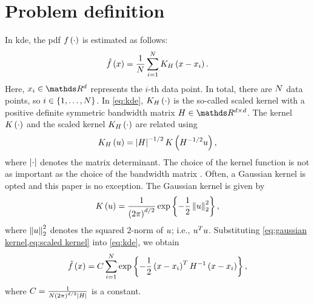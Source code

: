 \section{Problem definition}
\label{sec:problem}

In \ac{kde}, the \ac{pdf} $f\left( \cdot \right)$ is estimated as follows:
\begin{equation}
	\label{eq:kde}
	\hat{f}\left( x \right) = 
	\frac{1}{N} \sum_{i=1}^{N} 
	K_{H} \left( x - x_{i} \right).
\end{equation}
Here, $\datapoint{\indexdata} \in \realnumbers^{\dimension}$ represents the $i$-th data point.
In total, there are $N$ data points, so $i \in \{1, \ldots, N\}$.
In \cref{eq:kde}, $K_{H} \left( \cdot \right)$ is the so-called scaled kernel with a positive definite symmetric bandwidth matrix $\bandwidthmatrix \in \realnumbers^{\dimension \times \dimension}$.
The kernel $K \left( \cdot \right)$ and the scaled kernel $K_{H} \left( \cdot \right)$ are related using
\begin{equation}
	\label{eq:scaled kernel}
	K_{H} \left( u \right)
	= \left| H \right|^{-1/2} K \left(  H^{-1/2} u  \right),
\end{equation}
where $\left| \cdot \right|$ denotes the matrix determinant.
The choice of the kernel function is not as important as the choice of the bandwidth matrix \autocite{turlach1993bandwidthselection}.
Often, a Gaussian kernel is opted and this paper is no exception.
The Gaussian kernel is given by
\begin{equation}
	\label{eq:gaussian kernel}
	K \left( u \right) = \frac{1}{\left(2 \pi \right)^{d/2}} \exp\left\{  -\frac{1}{2} \left\Vert u \right\Vert_2^2 \right\},
\end{equation}
where $\left\Vert u \right\Vert_2^2$ denotes the squared 2-norm of $u$; i.e., $u^T u$.
Substituting \cref{eq:gaussian kernel,eq:scaled kernel} into \cref{eq:kde}, we obtain
\begin{equation}
	\label{eq:gaussian kde}
	\hat{f}\left( x \right)
	= C
	\sum_{i=1}^{N} 
	\exp\left\{ -\frac{1}{2} \left( x - x_{i} \right)^T H^{-1} \left( x - x_{i} \right) \right\},
\end{equation}
where $C=\frac{1}{N \left(2\pi\right)^{d/2} \left| H \right|}$ is a constant.

